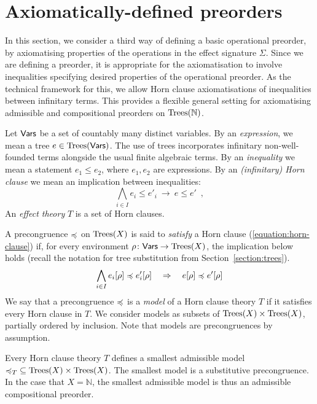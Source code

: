 \section{Axiomatically-defined preorders}

In this section, we consider a third way of defining a basic operational preorder, by axiomatising
properties of the operations in the effect signature $\Sigma$.
Since we are defining a preorder, it is appropriate for the axiomatisation to involve inequalities
specifying desired properties of the operational preorder. As the technical framework for this, we allow
Horn clause axiomatisations of inequalities between infinitary terms.  This provides a flexible general setting for
axiomatising admissible and compositional preorders on 
$\textnormal{Trees}(\mathbb{N})$. 

Let $\mathsf{Vars}$ be a set of countably many distinct variables. By an  \emph{expression}, we mean a
tree $e \in \textnormal{Trees}(\mathsf{Vars})$. The use of trees incorporates infinitary non-well-founded terms alongside the usual finite
algebraic terms. By an \emph{inequality} we mean a statement $e_1 \leq e_2$, where $e_1, e_2$ are expressions.
By an \emph{(infinitary) Horn clause} we mean an implication between inequalities:
\begin{equation}
\label{equation:horn-clause}
\bigwedge_{i \in I} e_i \leq e'_i ~ \rightarrow ~ e \leq e' \enspace ,
\end{equation}
An \emph{effect theory} $T$  is a set of Horn clauses.

A precongruence $\preccurlyeq$ on $\textnormal{Trees}(X)$ is said to \emph{satisfy} a Horn clause (\ref{equation:horn-clause}) if,
for every environment $\rho \colon \mathsf{Vars} \to \textnormal{Trees}(X)$, the implication below holds (recall the notation for tree substitution from Section~\ref{section:trees}).
\[
\bigwedge_{i \in I} e_i[\rho] \preccurlyeq e'_i[\rho]~~~ \Rightarrow ~~~ e[\rho] \preccurlyeq e'[\rho] 
\]
We say that a precongruence $\preccurlyeq$ is a \emph{model} of a Horn clause theory $T$ if it satisfies every Horn clause in $T$.
We consider models as subsets of $\textnormal{Trees}(X) \times \textnormal{Trees}(X)$, partially ordered by inclusion. Note that models are precongruences by assumption.
\begin{aproposition}
Every Horn clause theory $T$ defines a smallest admissible model  ${\preccurlyeq_T} \subseteq \textnormal{Trees}(X) \times \textnormal{Trees}(X)$. The smallest model
is a substitutive precongruence. In the case that $X = \mathbb{N}$, the smallest admissible model is thus an
admissible compositional preorder.
\end{aproposition}